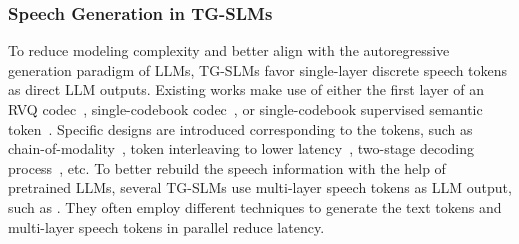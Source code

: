 \subsubsection{Speech Generation in TG-SLMs}
To reduce modeling complexity and better align with the autoregressive generation paradigm of LLMs, TG-SLMs favor single-layer discrete speech tokens as direct LLM outputs. 
Existing works make use of either the first layer of an RVQ codec~\cite{zhang2024speechgptgen}, single-codebook codec~\cite{fu2025vita}, or single-codebook supervised semantic token~\cite{zeng2024glm,luo2025openomni}.
Specific designs are introduced corresponding to the tokens, such as chain-of-modality~\cite{zhang2024speechgptgen}, token interleaving to lower latency~\cite{zeng2024glm}, two-stage decoding process~\cite{fu2025vita}, etc.
To better rebuild the speech information with the help of pretrained LLMs, several TG-SLMs use multi-layer speech tokens as LLM output, such as \cite{kyutai2024moshi,Xie2024MiniOmniLM,xie2024mini2}.
They often employ different techniques to generate the text tokens and multi-layer speech tokens in parallel reduce latency.

